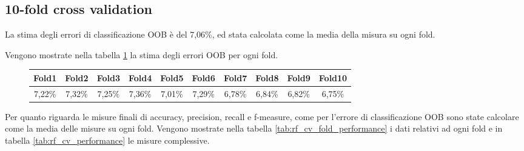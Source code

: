 \subsection{10-fold cross validation}
La stima degli errori di classificazione OOB è del 7,06\%, ed stata calcolata 
come la media della misura su ogni fold.

Vengono mostrate nella tabella \ref{tab:rf_cv_OOB} la stima degli errori OOB 
per ogni fold.

\begin{figure}[H]
	\centering
	\begin{tabular}{cccccccccc}
		\toprule
		\textbf{Fold1} & \textbf{Fold2} & \textbf{Fold3} & \textbf{Fold4} & 
		\textbf{Fold5} & \textbf{Fold6} & \textbf{Fold7} & \textbf{Fold8} & 
		\textbf{Fold9} & \textbf{Fold10} \\
		\midrule
		7,22\% & 7,32\% & 7,25\% & 7,36\% & 7,01\% & 7,29\% & 6,78\% & 6,84\% & 
		6,82\% & 6,75\%  	\\ 
		\bottomrule
	\end{tabular}
	\label{tab:rf_cv_OOB}
\end{figure}

Per quanto riguarda le misure finali di accuracy, precision, recall e 
f-measure, come per l'errore di classificazione OOB sono state calcolare come 
la media delle misure su ogni fold. 
Vengono mostrate nella tabella \ref{tab:rf_cv_fold_performance} i dati relativi 
ad ogni fold e in tabella \ref{tab:rf_cv_performance} le misure complessive.

